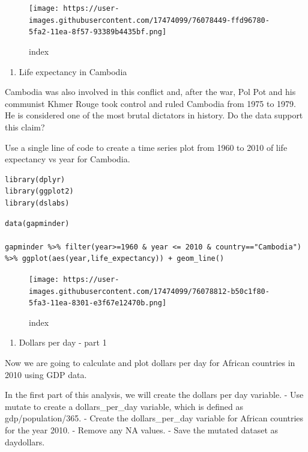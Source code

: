 \documentclass[
]{article}
\providecommand{\tightlist}{%
  \setlength{\itemsep}{0pt}\setlength{\parskip}{0pt}}
\begin{document}
\begin{figure}
\centering
\texttt{[image: https://user-images.githubusercontent.com/17474099/76078449-ffd96780-5fa2-11ea-8f57-93389b4435bf.png]}
\caption{index}
\end{figure}

\begin{enumerate}
\def\labelenumi{\arabic{enumi}.}
\setcounter{enumi}{5}
\tightlist
\item
  Life expectancy in Cambodia
\end{enumerate}

Cambodia was also involved in this conflict and, after the war, Pol Pot
and his communist Khmer Rouge took control and ruled Cambodia from 1975
to 1979. He is considered one of the most brutal dictators in history.
Do the data support this claim?

Use a single line of code to create a time series plot from 1960 to 2010
of life expectancy vs year for Cambodia.

\begin{verbatim}
library(dplyr)
library(ggplot2)
library(dslabs)
\end{verbatim}

\begin{verbatim}
data(gapminder)

gapminder %>% filter(year>=1960 & year <= 2010 & country=="Cambodia") %>% ggplot(aes(year,life_expectancy)) + geom_line()
\end{verbatim}

\begin{figure}
\centering
\texttt{[image: https://user-images.githubusercontent.com/17474099/76078812-b50c1f80-5fa3-11ea-8301-e3f67e12470b.png]}
\caption{index}
\end{figure}

\begin{enumerate}
\def\labelenumi{\arabic{enumi}.}
\setcounter{enumi}{6}
\tightlist
\item
  Dollars per day - part 1
\end{enumerate}

Now we are going to calculate and plot dollars per day for African
countries in 2010 using GDP data.

In the first part of this analysis, we will create the dollars per day
variable. - Use mutate to create a dollars\_per\_day variable, which is
defined as gdp/population/365. - Create the dollars\_per\_day variable
for African countries for the year 2010. - Remove any NA values. - Save
the mutated dataset as daydollars.
\end{document}

